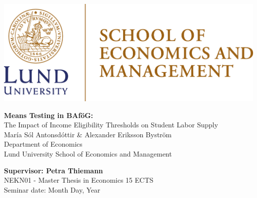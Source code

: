 
    \includegraphics[scale = 0.15]{images/LUSEM_RGB.png} %

\vspace{2cm}
    \begin{center}       
        \vspace*{2cm}
        {\LARGE {\textbf{Means Testing in BAföG:}  \\
        The Impact of Income Eligibility Thresholds on Student Labor Supply
        }} \\
        \vspace{1cm}
        \Large{María Sól Antonsdóttir \& Alexander Eriksson Byström} \normalsize{\\ Department of Economics \\ Lund University School of Economics and Management}
    \end{center}
    \vspace{2cm}

\vfill
\noindent 
\textbf{Supervisor: Petra Thiemann} \\ 
NEKN01 - Master Thesis in Economics 15 ECTS \\ 
Seminar date: Month Day, Year
\thispagestyle{empty}

\newpage
\tableofcontents
\thispagestyle{empty}
